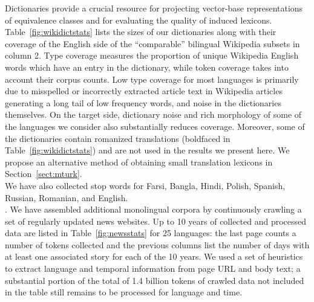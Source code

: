 \documentclass{article}
\newcommand{\mtodo}[1]{}
\newcommand{\secref}[1]{Section~\ref{#1}}
\newcommand{\tabref}[1]{Table~\ref{#1}}
\begin{document}

  Dictionaries provide a crucial resource for projecting vector-base representations of equivalence classes and for evaluating the quality of induced lexicons.  \tabref{fig:wikidictstats} lists the sizes of our dictionaries along with their coverage of the English side of the ``comparable'' bilingual Wikipedia subsets in column 2.  Type coverage measures the proportion of unique Wikipedia English words which have an entry in the dictionary, while token coverage takes into account their corpus counts. Low type coverage for most languages is primarily due to misspelled or incorrectly extracted article text in Wikipedia articles generating a long tail of low frequency words, and noise in the dictionaries themselves.  On the target side, dictionary noise and rich morphology of some of the languages we consider also substantially reduces coverage.  Moreover, some of the dictionaries contain romanized translations (boldfaced in \tabref{fig:wikidictstats}) and are not used in the results we present here.  %
We propose an alternative method of obtaining small translation lexicons in \secref{sect:mturk}.\\ 

 We have also collected stop words for Farsi, Bangla, Hindi, Polish, Spanish, Russian, Romanian, and English.\\

.  We have assembled additional monolingual corpora by continuously crawling a set of regularly updated news websites.  Up to 10 years of collected and processed data are listed in \tabref{fig:newsstats} for 25 languages: the last page counts a number of tokens collected and the previous columns list the number of days with at least one associated story for each of the 10 years.  We used a set of heuristics to extract language and temporal information from page URL and body text; a substantial portion of the total of 1.4 billion tokens of crawled data not included in the table still remains to be processed for language and time.\\
\end{document}
